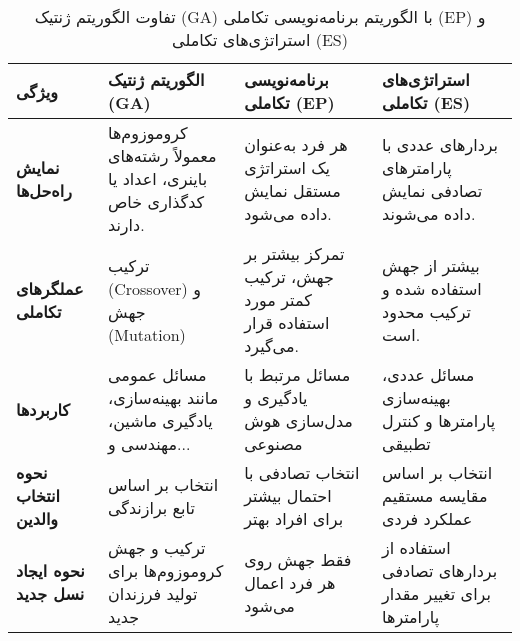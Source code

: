 \documentclass[12pt]{exam}
\begin{document}
\begin{questions}
\begin{enumerate}
		\end{enumerate}
	

\begin{table}[H]
\centering
\begin{tabular}{|p{2.5cm}|p{4cm}|p{4cm}|p{4cm}|}
\hline
\textbf{ویژگی} & \textbf{الگوریتم ژنتیک (GA)} & \textbf{برنامه‌نویسی تکاملی (EP)} & \textbf{استراتژی‌های تکاملی (ES)} \\ \hline
\textbf{
	نمایش راه‌حل‌ها} & کروموزوم‌ها معمولاً رشته‌های باینری، اعداد یا کدگذاری خاص دارند. & هر فرد به‌عنوان یک استراتژی مستقل نمایش داده می‌شود. & بردارهای عددی با پارامترهای تصادفی نمایش داده می‌شوند. \\ \hline
\textbf{عملگرهای تکاملی}
& ترکیب (Crossover) و جهش (Mutation) & تمرکز بیشتر بر جهش، ترکیب کمتر مورد استفاده قرار می‌گیرد. & بیشتر از جهش استفاده شده و ترکیب محدود است. \\ \hline
\textbf{کاربردها}
& مسائل عمومی مانند بهینه‌سازی، یادگیری ماشین، مهندسی و... & مسائل مرتبط با یادگیری و مدل‌سازی هوش مصنوعی & مسائل عددی، بهینه‌سازی پارامترها و کنترل تطبیقی  \\ \hline
\textbf{نحوه انتخاب والدین}
& انتخاب بر اساس تابع برازندگی & انتخاب تصادفی با احتمال بیشتر برای افراد بهتر & انتخاب بر اساس مقایسه مستقیم عملکرد فردی \\ \hline
\textbf{نحوه ایجاد نسل جدید} 
& ترکیب و جهش کروموزوم‌ها برای تولید فرزندان جدید & فقط جهش روی هر فرد اعمال می‌شود & استفاده از بردارهای تصادفی برای تغییر مقدار پارامترها\\ \hline
\end{tabular}
\caption{تفاوت الگوریتم ژنتیک (GA) با الگوریتم برنامه‌نویسی تکاملی (EP) و استراتژی‌های تکاملی (ES)}
\end{table}
\newpage

	\question
\end{questions}
\end{document}
